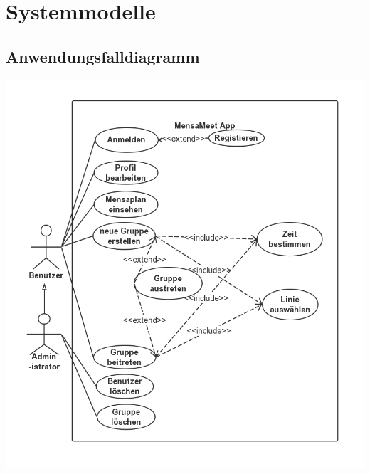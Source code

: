 \documentclass[a4paper]{scrreprt}
\begin{document}
\chapter{Systemmodelle}
\section{Anwendungsfalldiagramm}
\begin{center}
	\includegraphics[scale=0.5]{res/useCase_MensaMeet.png}
\end{center}
\newpage
\end{document}
